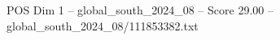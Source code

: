\begin{textsample}{POS Dim 1 – global\_south\_2024\_08 – Score 29.00 – global\_south\_2024\_08/111853382.txt}
\end{textsample}
